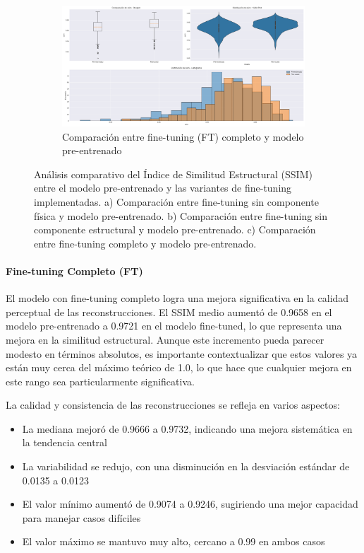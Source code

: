 \begin{figure}[H]
    \begin{subfigure}[b]{0.7\textwidth}
        \centering
        \includegraphics[width=\textwidth]{Images/comparison_plots_ssim_sup.png}
        \caption{Comparación entre fine-tuning (FT) completo y modelo pre-entrenado}
        \label{fig:ssim_box}
    \end{subfigure}
    
    \caption{Análisis comparativo del Índice de Similitud Estructural (SSIM) entre el modelo pre-entrenado y las variantes de fine-tuning implementadas. a) Comparación entre fine-tuning sin componente física y modelo pre-entrenado. b) Comparación entre fine-tuning sin componente estructural y modelo pre-entrenado. c) Comparación entre fine-tuning completo y modelo pre-entrenado.}
    \label{fig:ssim_analysis}
\end{figure}


\paragraph{Fine-tuning Completo (FT)}
El modelo con fine-tuning completo logra una mejora significativa en la calidad perceptual de las reconstrucciones. El SSIM medio aumentó de 0.9658 en el modelo pre-entrenado a 0.9721 en el modelo fine-tuned, lo que representa una mejora en la similitud estructural. Aunque este incremento pueda parecer modesto en términos absolutos, es importante contextualizar que estos valores ya están muy cerca del máximo teórico de 1.0, lo que hace que cualquier mejora en este rango sea particularmente significativa.

La calidad y consistencia de las reconstrucciones se refleja en varios aspectos:

\begin{itemize}
    \item La mediana mejoró de 0.9666 a 0.9732, indicando una mejora sistemática en la tendencia central
    \item La variabilidad se redujo, con una disminución en la desviación estándar de 0.0135 a 0.0123
    \item El valor mínimo aumentó de 0.9074 a 0.9246, sugiriendo una mejor capacidad para manejar casos difíciles
    \item El valor máximo se mantuvo muy alto, cercano a 0.99 en ambos casos
\end{itemize}

